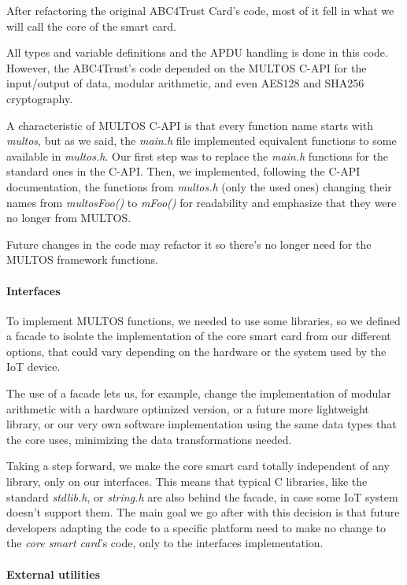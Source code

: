 After refactoring the original ABC4Trust Card's code, most of it fell in what we will call the core of the smart card.

All types and variable definitions and the APDU handling is done in this code.
However, the ABC4Trust's code depended on the MULTOS C-API for the input/output of data, modular arithmetic, and even AES128 and SHA256 cryptography.

A characteristic of MULTOS C-API is that every function name starts with \textit{multos}, but as we said, the \textit{main.h} file implemented equivalent functions to some available in \textit{multos.h}. Our first step was to replace the \textit{main.h} functions for the standard ones in the C-API. Then, we implemented, following the C-API documentation, the functions from \textit{multos.h} (only the used ones) changing their names from \textit{multosFoo()} to \textit{mFoo()} for readability and emphasize that they were no longer from MULTOS.

Future changes in the code may refactor it so there's no longer need for the MULTOS framework functions.


\paragraph{Interfaces}

To implement MULTOS functions, we needed to use some libraries, so we defined a facade to isolate the implementation of the core smart card from our different options, that could vary depending on the hardware or the system used by the IoT device.

The use of a facade lets us, for example, change the implementation of modular arithmetic with a hardware optimized version, or a future more lightweight library, or our very own software implementation using the same data types that the core uses, minimizing the data transformations needed.

Taking a step forward, we make the core smart card totally independent of any library, only on our interfaces. This means that typical C libraries, like the standard \textit{stdlib.h}, or  \textit{string.h} are also behind the facade, in case some IoT system doesn't support them. The main goal we go after with this decision is that future developers adapting the code to a specific platform need to make no change to the \textit{core smart card}'s code, only to the interfaces implementation.



\paragraph{External utilities}

